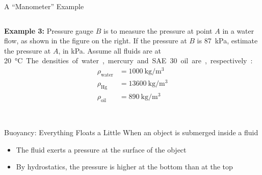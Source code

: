 \documentclass[12pt,aspectratio=169]{beamer}
\begin{document}
\begin{frame}{A ``Manometer'' Example}
  \begin{columns}
    \textbf{Example 3:} Pressure gauge $B$ is to measure the pressure at point
    $A$ in a water flow, as shown in the figure on the right. If the pressure at
    $B$ is \SI{87}{\kilo\pascal}, estimate the pressure at $A$, in
    \si{\kilo\pascal}. Assume all fluids are at \SI{20}\celsius. The densities
    of water, mercury and SAE 30 oil are, respectively:

    \vspace{-.3in}
    \begin{align*}
      \rho_\text{water}&=\SI{1000}{\kilo\gram\per\metre^3}\\
      \rho_\text{Hg}&=\SI{13600}{\kilo\gram\per\metre^3}\\
      \rho_\text{oil}&=\SI{890}{\kilo\gram\per\metre^3}
    \end{align*}
    
  \end{columns}
\end{frame}



%
%    



\begin{frame}{Buoyancy: Everything Floats a Little}
  When an object is submerged inside a fluid
  \begin{itemize}
  \item The fluid exerts a pressure at the surface of the object
  \item By hydrostatics, the pressure is higher at the bottom than at the top
  \end{itemize}
  \begin{center}
  \end{center}
\end{frame}
\end{document}
